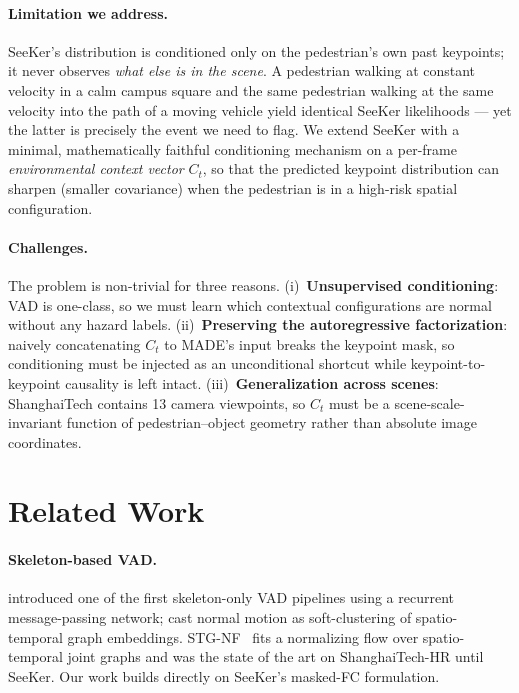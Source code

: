 \documentclass{article}
\begin{document}
\paragraph{Limitation we address.}
SeeKer's distribution is conditioned only on the pedestrian's own past
keypoints; it never observes \emph{what else is in the scene}. A pedestrian
walking at constant velocity in a calm campus square and the same pedestrian
walking at the same velocity into the path of a moving vehicle yield
identical SeeKer likelihoods --- yet the latter is precisely the event we
need to flag. We extend SeeKer with a minimal, mathematically faithful
conditioning mechanism on a per-frame \emph{environmental context vector}
$C_t$, so that the predicted keypoint distribution can sharpen (smaller
covariance) when the pedestrian is in a high-risk spatial configuration.

\paragraph{Challenges.}
The problem is non-trivial for three reasons.
(i)~\textbf{Unsupervised conditioning}: VAD is one-class, so we must learn
which contextual configurations are normal without any hazard labels.
(ii)~\textbf{Preserving the autoregressive factorization}: naively
concatenating $C_t$ to MADE's input breaks the keypoint mask, so
conditioning must be injected as an unconditional shortcut while
keypoint-to-keypoint causality is left intact.
(iii)~\textbf{Generalization across scenes}: ShanghaiTech contains 13 camera
viewpoints, so $C_t$ must be a scene-scale-invariant function of
pedestrian--object geometry rather than absolute image coordinates.

\section{Related Work}
\label{sec:related}

\paragraph{Skeleton-based VAD.}
\citet{morais2019messagepassing} introduced one of the first skeleton-only
VAD pipelines using a recurrent message-passing network;
\citet{markovitz2020graph} cast normal motion as soft-clustering of
spatio-temporal graph embeddings. STG-NF~\citep{hirschorn2023normalizing}
fits a normalizing flow over spatio-temporal joint graphs and was the state
of the art on ShanghaiTech-HR until SeeKer. Our work builds directly on
SeeKer's masked-FC formulation.
\end{document}
